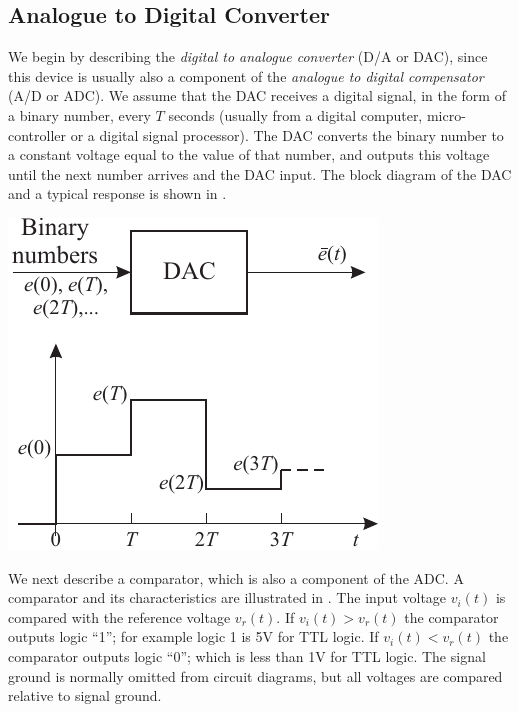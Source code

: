 \subsection*{Analogue to Digital Converter}

We begin by describing the \emph{digital to analogue converter} (D/A
or DAC), since this device is usually also a component of the
\emph{analogue to digital compensator} (A/D or ADC). We assume that
the DAC receives a digital signal, in the form of a binary number,
every $T$ seconds (usually from a digital computer, micro-controller or
a digital signal processor). The DAC converts the binary number to a
constant voltage equal to the value of that number, and outputs this
voltage until the next number arrives and the DAC input. The block
diagram of the DAC and a typical response is shown in
.

\begin{slide}\label{slide:DAC}
\begin{center}
  \includegraphics{pictures/DAC.pdf}
\end{center}
\end{slide}

We next describe a comparator, which is also a component of the ADC. A
comparator and its characteristics are illustrated in
. The input voltage $v_i(t)$ is compared with the
reference voltage $v_r(t)$.  If $v_i(t) > v_r(t)$ the comparator
outputs logic ``1''; for example logic 1 is 5V for TTL logic.  If
$v_i(t) < v_r(t)$ the comparator outputs logic ``0''; which is less
than 1V for TTL logic. The signal ground is normally omitted from
circuit diagrams, but all voltages are compared relative to signal
ground.

